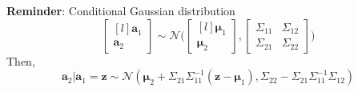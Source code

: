 \documentclass[twoside]{article}
\begin{document}
\textbf{Reminder}: Conditional Gaussian distribution
\begin{equation*}
    \begin{bmatrix*}[l]
\textbf{a}_1\\
\textbf{a}_2
\end{bmatrix*}
\sim \mathcal{N}\Bigg(\begin{bmatrix*}[l]
\boldsymbol{\mu}_1\\
\boldsymbol{\mu}_2
\end{bmatrix*}, \begin{bmatrix*}
\Sigma_{11} & \Sigma_{12}\\
\Sigma_{21} & \Sigma_{22}
\end{bmatrix*}\Bigg)
\end{equation*}
Then,
\begin{equation*}
    \textbf{a}_2 | \textbf{a}_1 = \boldsymbol{z} \sim \mathcal{N}(\boldsymbol{\mu}_2 + \Sigma_{21}\Sigma_{11}^{-1}(\boldsymbol{z} - \boldsymbol{\mu}_1), \Sigma_{22} - \Sigma_{21}\Sigma_{11}^{-1}\Sigma_{12})
\end{equation*}\medskip
\end{document}
